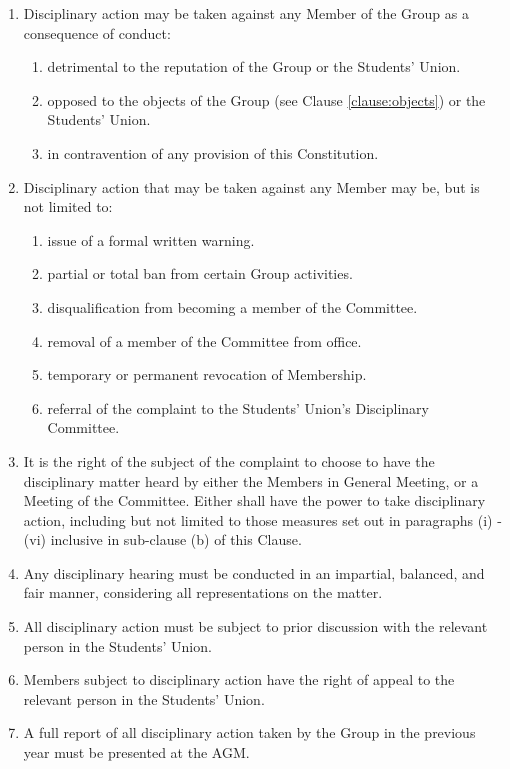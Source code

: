 \documentclass[12pt]{constitution}
\begin{document}
\begin{enumerate}
    \item Disciplinary action may be taken against any Member of the Group as a consequence of conduct:
    \begin{enumerate}
        \item detrimental to the reputation of the Group or the Students' Union.
        \item opposed to the objects of the Group (see Clause \ref{clause:objects}) or the Students' Union.
        \item in contravention of any provision of this Constitution.
    \end{enumerate}
    \item Disciplinary action that may be taken against any Member may be, but is not limited to:
    \begin{enumerate}
        \item issue of a formal written warning.
        \item partial or total ban from certain Group activities.
        \item disqualification from becoming a member of the Committee.
        \item removal of a member of the Committee from office.
        \item temporary or permanent revocation of Membership.
        \item referral of the complaint to the Students' Union's Disciplinary Committee.
    \end{enumerate}

    \item It is the right of the subject of the complaint to choose to have the disciplinary matter heard by either the Members in General Meeting, or a Meeting of the Committee.  Either shall have the power to take disciplinary action, including but not limited to those measures set out in paragraphs (i) - (vi) inclusive in sub-clause (b) of this Clause.

    \item Any disciplinary hearing must be conducted in an impartial, balanced, and fair manner, considering all representations on the matter.

    \item All disciplinary action must be subject to prior discussion with the relevant person in the Students' Union.

    \item Members subject to disciplinary action have the right of appeal to the relevant person in the Students' Union.

    \item A full report of all disciplinary action taken by the Group in the previous year must be presented at the AGM.
\end{enumerate}
\end{document}
